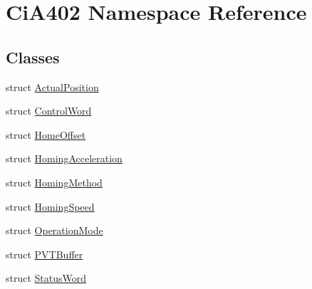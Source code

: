 \hypertarget{namespace_ci_a402}{}\section{Ci\+A402 Namespace Reference}
\label{namespace_ci_a402}
\subsection*{Classes}
\begin{DoxyCompactItemize}
\item 
struct \hyperlink{struct_ci_a402_1_1_actual_position}{Actual\+Position}
\item 
struct \hyperlink{struct_ci_a402_1_1_control_word}{Control\+Word}
\item 
struct \hyperlink{struct_ci_a402_1_1_home_offset}{Home\+Offset}
\item 
struct \hyperlink{struct_ci_a402_1_1_homing_acceleration}{Homing\+Acceleration}
\item 
struct \hyperlink{struct_ci_a402_1_1_homing_method}{Homing\+Method}
\item 
struct \hyperlink{struct_ci_a402_1_1_homing_speed}{Homing\+Speed}
\item 
struct \hyperlink{struct_ci_a402_1_1_operation_mode}{Operation\+Mode}
\item 
struct \hyperlink{struct_ci_a402_1_1_p_v_t_buffer}{P\+V\+T\+Buffer}
\item 
struct \hyperlink{struct_ci_a402_1_1_status_word}{Status\+Word}
\end{DoxyCompactItemize}
